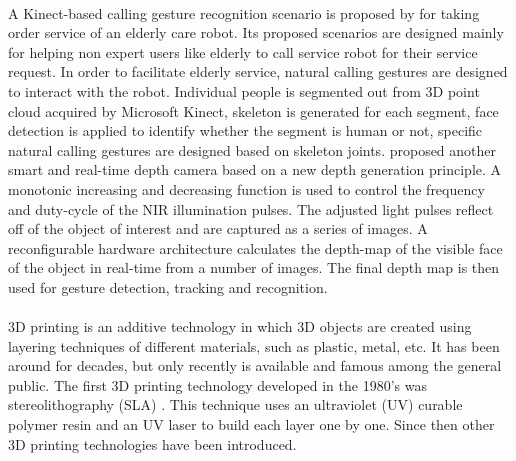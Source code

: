 \\%
A Kinect-based calling gesture recognition scenario is proposed by \cite{gestureKinect14} for taking order service of an elderly care robot. Its proposed scenarios are designed mainly for helping non expert users like elderly to call service robot for their service request. In order to facilitate elderly service, natural calling gestures are designed to interact with the robot. Individual people is segmented out from 3D point cloud acquired by Microsoft Kinect, skeleton is generated for each segment, face detection is applied to identify whether the segment is human or not, specific natural calling gestures are designed based on skeleton joints. \cite{NIRGesture14} proposed another smart and real-time depth camera based on a new depth generation principle. A monotonic increasing and decreasing function is used to control the frequency and duty-cycle of the NIR illumination pulses. The adjusted light pulses reflect off of the object of interest and are captured as a series of images. A reconfigurable hardware architecture calculates the depth-map of the visible face of the object in real-time from a number of images. The final depth map is then used for gesture detection, tracking and recognition.
\\\\%
3D printing is an additive technology in which 3D objects are created using layering techniques of different materials, such as plastic, metal, etc.  It has been around for decades, but only recently is available and famous among the general public. The first 3D printing technology developed in the 1980’s was stereolithography (SLA) \cite{Patent3Dprinting86}. This technique uses an ultraviolet (UV) curable polymer resin and an UV laser to build each layer one by one. Since then other 3D printing technologies have been introduced.
%
